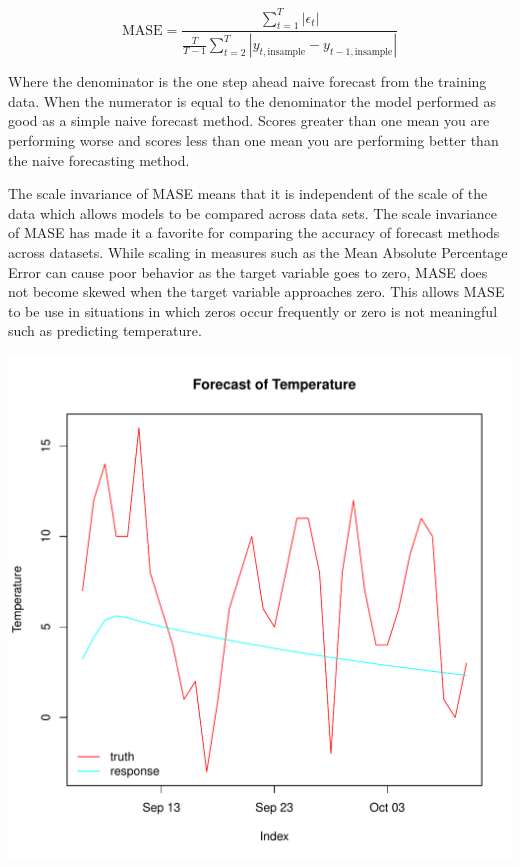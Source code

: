 \documentclass{article}\usepackage[]{graphicx}\usepackage[]{color}
\makeatletter
\def\maxwidth{ %
  \ifdim\Gin@nat@width>\linewidth
    \linewidth
  \else
    \Gin@nat@width
  \fi
}
\newenvironment{knitrout}{}{} %
\theoremstyle{definition}
\makeatother
\begin{document}
\begin{equation}
\text{MASE} = \frac{\sum_{t=1}^T |\epsilon_t|}{\frac{T}{T-1} \sum_{t=2}^T |y_{t, \text{insample}} - y_{t-1, \text{insample}}|}
\end{equation}

Where the denominator is the one step ahead naive forecast from the training data. When the numerator is equal to the denominator the model performed as good as a simple naive forecast method. Scores greater than one mean you are performing worse and scores less than one mean you are performing better than the naive forecasting method.

The scale invariance of MASE means that it is independent of the scale of the data which allows models to be compared across data sets. The scale invariance of MASE has made it a favorite for comparing the accuracy of forecast methods ~\cite{noteMase} across datasets. While scaling in measures such as the Mean Absolute Percentage Error can cause poor behavior as the target variable goes to zero, MASE does not become skewed when the target variable approaches zero. This allows MASE to be use in situations in which zeros occur frequently or zero is not meaningful such as predicting temperature. 

\begin{knitrout}
\color{fgcolor}
\includegraphics[width=\maxwidth]{figure/plotbatsTrain-1} 

\end{knitrout}
\end{document}

